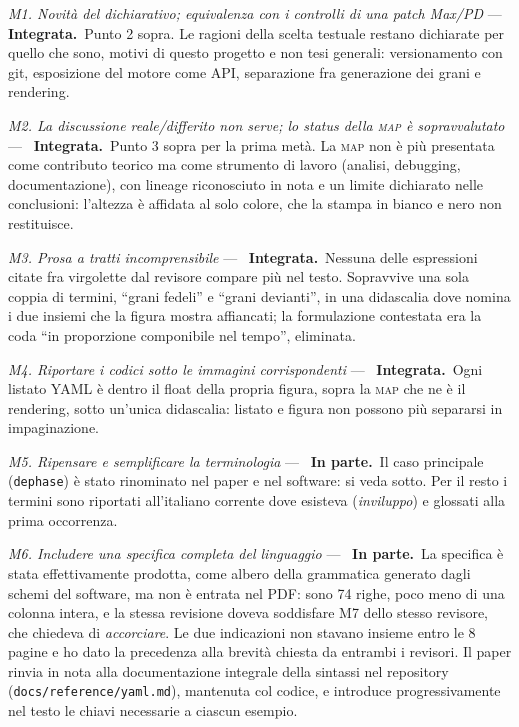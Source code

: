 \documentclass[11pt,a4paper]{article}
\newcommand{\integrata}{\textbf{Integrata.}}
\newcommand{\parziale}{\textbf{In parte.}}
\newenvironment{rilievi}
  {\begin{list}{}{%
    \setlength{\leftmargin}{1.6em}\setlength{\itemindent}{-1.6em}%
    \setlength{\itemsep}{4pt}\setlength{\parsep}{0pt}\setlength{\topsep}{4pt}}}
  {\end{list}}
\newcommand{\voce}[1]{\item \textit{#1} ---\ }
\begin{document}
\begin{rilievi}

\voce{M1. Novità del dichiarativo; equivalenza con i controlli di una patch
Max/PD} \integrata\ Punto 2 sopra. Le ragioni della scelta testuale restano
dichiarate per quello che sono, motivi di questo progetto e non tesi
generali: versionamento con git, esposizione del motore come API,
separazione fra generazione dei grani e rendering.

\voce{M2. La discussione reale/differito non serve; lo status della
\textsc{map} è sopravvalutato} \integrata\ Punto 3 sopra per la prima metà.
La \textsc{map} non è più presentata come contributo teorico ma come
strumento di lavoro (analisi, debugging, documentazione), con lineage
riconosciuto in nota e un limite dichiarato nelle conclusioni: l'altezza è
affidata al solo colore, che la stampa in bianco e nero non restituisce.

\voce{M3. Prosa a tratti incomprensibile} \integrata\ Nessuna delle
espressioni citate fra virgolette dal revisore compare più nel testo.
Sopravvive una sola coppia di termini, ``grani fedeli'' e ``grani
devianti'', in una didascalia dove nomina i due insiemi che la figura mostra
affiancati; la formulazione contestata era la coda ``in proporzione
componibile nel tempo'', eliminata.

\voce{M4. Riportare i codici sotto le immagini corrispondenti} \integrata\
Ogni listato YAML è dentro il float della propria figura, sopra la
\textsc{map} che ne è il rendering, sotto un'unica didascalia: listato e
figura non possono più separarsi in impaginazione.

\voce{M5. Ripensare e semplificare la terminologia} \parziale\ Il caso
principale (\texttt{dephase}) è stato rinominato nel paper e nel software:
si veda sotto. Per il resto i termini sono riportati all'italiano corrente
dove esisteva (\emph{inviluppo}) e glossati alla prima occorrenza.

\voce{M6. Includere una specifica completa del linguaggio} \parziale\ La
specifica è stata effettivamente prodotta, come albero della grammatica
generato dagli schemi del software, ma non è entrata nel PDF: sono 74
righe, poco meno di una colonna intera, e la stessa revisione doveva
soddisfare M7 dello stesso revisore, che chiedeva di \emph{accorciare}.
Le due indicazioni non stavano insieme entro le 8 pagine e ho dato la
precedenza alla brevità chiesta da entrambi i revisori. Il paper rinvia in
nota alla documentazione integrale della sintassi nel repository
(\texttt{docs/reference/yaml.md}), mantenuta col codice, e introduce
progressivamente nel testo le chiavi necessarie a ciascun esempio.


\end{rilievi}
\end{document}
